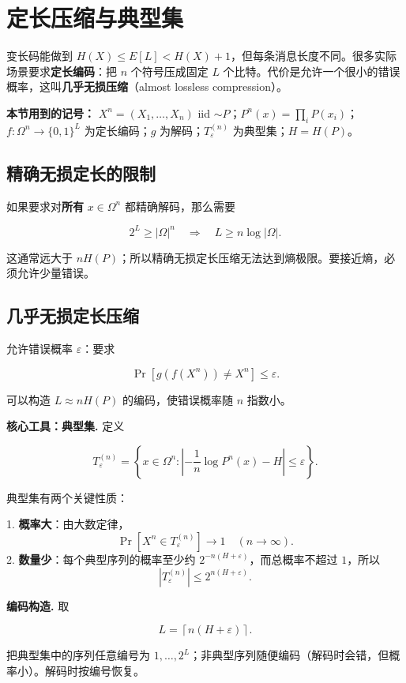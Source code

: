 \section{定长压缩与典型集}


变长码能做到 $H(X)\le E[L]<H(X)+1$，但每条消息长度不同。很多实际场景要求\textbf{定长编码}：把 $n$ 个符号压成固定 $L$ 个比特。代价是允许一个很小的错误概率，这叫\textbf{几乎无损压缩}（almost lossless compression）。

\textbf{本节用到的记号：} $X^n=(X_1,\dots,X_n)$ iid $\sim P$；$P^n(x)=\prod_iP(x_i)$；$f:\Omega^n\to\{0,1\}^L$ 为定长编码；$g$ 为解码；$T_\varepsilon^{(n)}$ 为典型集；$H=H(P)$。

\subsection{精确无损定长的限制}


如果要求对\textbf{所有} $x\in\Omega^n$ 都精确解码，那么需要

\[
2^L\ge|\Omega|^n
\quad\Longrightarrow\quad
L\ge n\log|\Omega|.
\]

这通常远大于 $nH(P)$；所以精确无损定长压缩无法达到熵极限。要接近熵，必须允许少量错误。

\subsection{几乎无损定长压缩}


允许错误概率 $\varepsilon$：要求

\[
\Pr[g(f(X^n))\ne X^n]\le\varepsilon.
\]

可以构造 $L\approx nH(P)$ 的编码，使错误概率随 $n$ 指数小。

\textbf{核心工具：典型集.} 定义

\[
T_\varepsilon^{(n)}
=\left\{x\in\Omega^n:
\left|-\frac1n\log P^n(x)-H\right|\le\varepsilon
\right\}.
\]

典型集有两个关键性质：

1. \textbf{概率大}：由大数定律，
\[
   \Pr[X^n\in T_\varepsilon^{(n)}]\to1
   \quad(n\to\infty).
\]
2. \textbf{数量少}：每个典型序列的概率至少约 $2^{-n(H+\varepsilon)}$，而总概率不超过 $1$，所以
\[
   |T_\varepsilon^{(n)}|\le2^{n(H+\varepsilon)}.
\]

\textbf{编码构造.} 取

\[
L=\left\lceil n(H+\varepsilon)\right\rceil.
\]

把典型集中的序列任意编号为 $1,\dots,2^L$；非典型序列随便编码（解码时会错，但概率小）。解码时按编号恢复。

